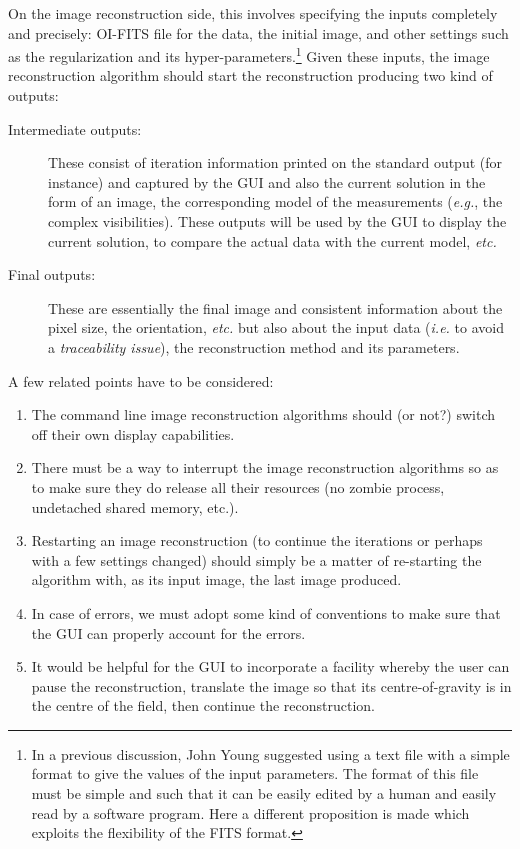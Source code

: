 \documentclass{article}
\begin{document}
On the image reconstruction side, this involves specifying the inputs
completely and precisely: OI-FITS file for the data, the initial
image, and other settings such as the regularization and its
hyper-parameters.\footnote{In a previous discussion, John Young
  suggested using a text file with a simple format to give the values
  of the input parameters. The format of this file must be simple and
  such that it can be easily edited by a human and easily read by a
  software program.  Here a different proposition is made which
  exploits the flexibility of the FITS format.} Given these inputs,
the image reconstruction algorithm should start the reconstruction
producing two kind of outputs:
\begin{description}
  \item[Intermediate outputs:]  These consist of iteration information
  printed on the standard output (for instance)  and captured by the GUI and
  also the current solution in the form of an image, the corresponding model
  of the measurements (\emph{e.g.}, the complex visibilities).  These outputs
  will be used by the GUI to display the current solution, to compare the
  actual data with the current model, \emph{etc.}

  \item[Final outputs:]  These are essentially the final image and consistent
  information about the pixel size, the orientation, \emph{etc.} but also
  about the input data (\emph{i.e.} to avoid a \emph{traceability issue}), the
  reconstruction method and its parameters.
\end{description}

A few related points have to be considered:
\begin{enumerate}
  \item The command line image reconstruction algorithms should (or not?)
  switch off their own display capabilities.

  \item There must be a way to interrupt the image reconstruction algorithms
  so as to make sure they do release all their resources (no zombie process,
  undetached shared memory, etc.).

  \item Restarting an image reconstruction (to continue the iterations
    or perhaps with a few settings changed) should simply be a matter
    of re-starting the algorithm with, as its input image, the last
    image produced.

  \item  In case of errors, we must adopt some kind of conventions to make
  sure that the GUI can properly account for the errors.

\item It would be helpful for the GUI to incorporate a facility
  whereby the user can pause the reconstruction, translate the image
  so that its centre-of-gravity is in the centre of the field, then
  continue the reconstruction.

\end{enumerate}
\end{document}
